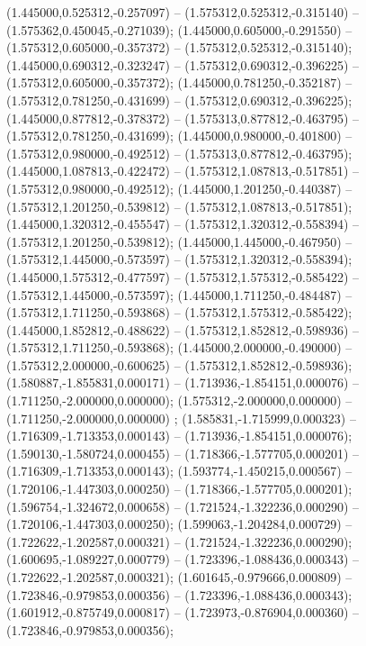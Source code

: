  (1.445000,0.525312,-0.257097) -- (1.575312,0.525312,-0.315140) -- (1.575362,0.450045,-0.271039);
 (1.445000,0.605000,-0.291550) -- (1.575312,0.605000,-0.357372) -- (1.575312,0.525312,-0.315140);
 (1.445000,0.690312,-0.323247) -- (1.575312,0.690312,-0.396225) -- (1.575312,0.605000,-0.357372);
 (1.445000,0.781250,-0.352187) -- (1.575312,0.781250,-0.431699) -- (1.575312,0.690312,-0.396225);
 (1.445000,0.877812,-0.378372) -- (1.575313,0.877812,-0.463795) -- (1.575312,0.781250,-0.431699);
 (1.445000,0.980000,-0.401800) -- (1.575312,0.980000,-0.492512) -- (1.575313,0.877812,-0.463795);
 (1.445000,1.087813,-0.422472) -- (1.575312,1.087813,-0.517851) -- (1.575312,0.980000,-0.492512);
 (1.445000,1.201250,-0.440387) -- (1.575312,1.201250,-0.539812) -- (1.575312,1.087813,-0.517851);
 (1.445000,1.320312,-0.455547) -- (1.575312,1.320312,-0.558394) -- (1.575312,1.201250,-0.539812);
 (1.445000,1.445000,-0.467950) -- (1.575312,1.445000,-0.573597) -- (1.575312,1.320312,-0.558394);
 (1.445000,1.575312,-0.477597) -- (1.575312,1.575312,-0.585422) -- (1.575312,1.445000,-0.573597);
 (1.445000,1.711250,-0.484487) -- (1.575312,1.711250,-0.593868) -- (1.575312,1.575312,-0.585422);
 (1.445000,1.852812,-0.488622) -- (1.575312,1.852812,-0.598936) -- (1.575312,1.711250,-0.593868);
 (1.445000,2.000000,-0.490000) -- (1.575312,2.000000,-0.600625) -- (1.575312,1.852812,-0.598936);
 (1.580887,-1.855831,0.000171) -- (1.713936,-1.854151,0.000076) -- (1.711250,-2.000000,0.000000);
 (1.575312,-2.000000,0.000000) -- (1.711250,-2.000000,0.000000) ;
 (1.585831,-1.715999,0.000323) -- (1.716309,-1.713353,0.000143) -- (1.713936,-1.854151,0.000076);
 (1.590130,-1.580724,0.000455) -- (1.718366,-1.577705,0.000201) -- (1.716309,-1.713353,0.000143);
 (1.593774,-1.450215,0.000567) -- (1.720106,-1.447303,0.000250) -- (1.718366,-1.577705,0.000201);
 (1.596754,-1.324672,0.000658) -- (1.721524,-1.322236,0.000290) -- (1.720106,-1.447303,0.000250);
 (1.599063,-1.204284,0.000729) -- (1.722622,-1.202587,0.000321) -- (1.721524,-1.322236,0.000290);
 (1.600695,-1.089227,0.000779) -- (1.723396,-1.088436,0.000343) -- (1.722622,-1.202587,0.000321);
 (1.601645,-0.979666,0.000809) -- (1.723846,-0.979853,0.000356) -- (1.723396,-1.088436,0.000343);
 (1.601912,-0.875749,0.000817) -- (1.723973,-0.876904,0.000360) -- (1.723846,-0.979853,0.000356);
